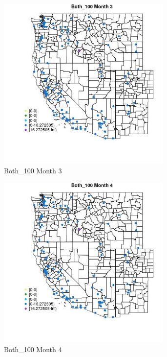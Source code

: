 \begin{figure} 
\centering  
\includegraphics[width=0.77\textwidth]{Code_Outputs/Report_ML_input_PM25_Step4_part_e_de_duplicated_aves_MapObsMo3Both_100.jpg} 
\caption{\label{fig:Report_ML_input_PM25_Step4_part_e_de_duplicated_avesMapObsMo3Both_100}Both_100 Month 3} 
\end{figure} 
 

\clearpage 

\begin{figure} 
\centering  
\includegraphics[width=0.77\textwidth]{Code_Outputs/Report_ML_input_PM25_Step4_part_e_de_duplicated_aves_MapObsMo4Both_100.jpg} 
\caption{\label{fig:Report_ML_input_PM25_Step4_part_e_de_duplicated_avesMapObsMo4Both_100}Both_100 Month 4} 
\end{figure} 
 

